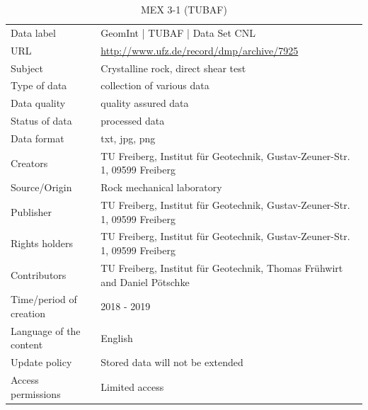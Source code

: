 \begin{table}[!ht]
\caption{MEX 3-1 (TUBAF)}
\label{tab:dms-mex3-1}
\small
\begin{tabular}{R{3cm}|L{7cm}}
\hline
%
Data label & GeomInt | TUBAF | Data Set CNL \\
URL &  \url{http://www.ufz.de/record/dmp/archive/7925} \\
Subject  & Crystalline rock, direct shear test \\
Type of data  & collection of various data \\
Data quality  & quality assured data \\
Status of data  & processed data \\
Data format  & txt, jpg, png \\
Creators  & TU Freiberg, Institut für Geotechnik, Gustav-Zeuner-Str. 1, 09599 Freiberg \\
Source/Origin  & Rock mechanical laboratory \\
Publisher  & TU Freiberg, Institut für Geotechnik, Gustav-Zeuner-Str. 1, 09599 Freiberg \\
Rights holders  & TU Freiberg, Institut für Geotechnik, Gustav-Zeuner-Str. 1, 09599 Freiberg \\
Contributors  & TU Freiberg, Institut für Geotechnik, Thomas Fr\"uhwirt and Daniel P\"otschke \\
Time/period of creation  & 2018 - 2019 \\
Language of the content & English \\
Update policy  & Stored data will not be extended \\
Access permissions  & Limited access \\
%
\hline
\end{tabular}
\end{table}